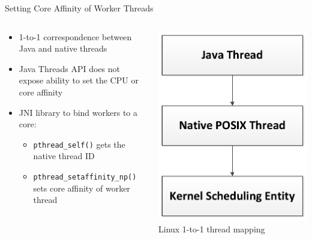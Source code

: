 \begin{frame}{Setting Core Affinity of Worker Threads}
  \begin{columns}[c]
    \begin{column}{0.62\textwidth}
      \begin{itemize}
      \item 1-to-1 correspondence between Java and native threads
      \item Java Threads API does not expose ability to set the CPU or
        core affinity
      \item JNI library to bind workers to a core:
        \begin{itemize}
        \item \lstinline!pthread_self()! gets the native thread ID
        \item \lstinline!pthread_setaffinity_np()! sets core affinity
          of worker thread
        \end{itemize}
      \end{itemize}
    \end{column}
    \begin{column}{0.38\textwidth}
      \begin{center}
        \includegraphics[width=\textwidth]{figures/java-threads} \\
        \tiny{Linux 1-to-1 thread mapping}
      \end{center}
    \end{column}
  \end{columns}
\end{frame}

